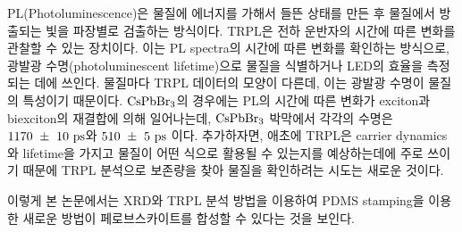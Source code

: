 PL(Photoluminescence)은 물질에 에너지를 가해서 들뜬 상태를 만든 후 물질에서 방출되는 빛을 파장별로 검출하는 방식이다. TRPL은 전하 운반자의 시간에 따른 변화를 관찰할 수 있는 장치이다. 이는 PL spectra의 시간에 따른 변화를 확인하는 방식으로, 광발광 수명(photoluminescent lifetime)으로 물질을 식별하거나 LED의 효율을 측정되는 데에 쓰인다. 물질마다 TRPL 데이터의 모양이 다른데, 이는 광발광 수명이 물질의 특성이기 때문이다. $\rm{CsPbBr_3}$의 경우에는 PL의 시간에 따른 변화가 exciton과 biexciton의 재결합에 의해 일어나는데, $\rm{CsPbBr_3}$ 박막에서 각각의 수명은 $\rm{1170~\pm~10~ps}$와 $\rm{510~\pm~5~ps}$ 이다\cite{chen2018room}. 추가하자면, 애초에 TRPL은 carrier dynamics와 lifetime을 가지고 물질이 어떤 식으로 활용될 수 있는지를 예상하는데에 주로 쓰이기 때문에 TRPL 분석으로 보존량을 찾아 물질을 확인하려는 시도는 새로운 것이다. 

이렇게 본 논문에서는 XRD와 TRPL 분석 방법을 이용하여 PDMS stamping을 이용한 새로운 방법이 페로브스카이트를 합성할 수 있다는 것을 보인다.

